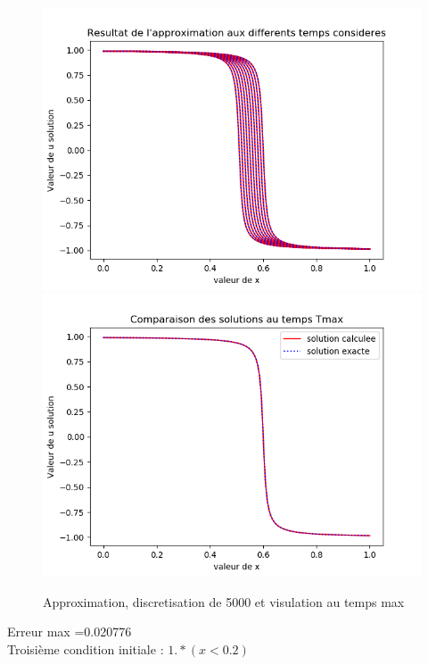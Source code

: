 \documentclass[12pt]{article}
\begin{document}
 \begin{figure}[H]
	\centering
	\includegraphics[scale=0.40]{1D_c1_5000_s2_init2.png}
	\includegraphics[scale=0.40]{Temp_max_c1_5000_s2_i2.png}
	\caption{Approximation, discretisation de 5000 et visulation au temps max}
	\label{1D} 
	\end{figure}
Erreur max =0.020776
\\Troisième condition initiale : $1.*(x<0.2)$
\end{document}
